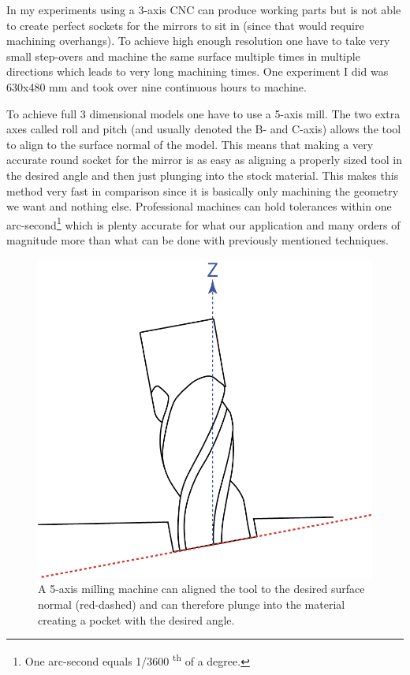 \documentclass{article}
\begin{document}
In my experiments using a 3-axis CNC can produce working parts but is
not able to create perfect sockets for the mirrors to sit in (since
that would require machining overhangs). To achieve high enough
resolution one have to take very small step-overs and machine the same
surface multiple times in multiple directions which leads to very long
machining times. One experiment I did was 630x480 mm and took over nine
continuous hours to machine.

To achieve full 3 dimensional models one have to use a 5-axis mill. The
two extra axes called roll and pitch (and usually denoted the B- and
C-axis) allows the tool to align to the surface normal of the model.
This means that making a very accurate round socket for the mirror is as
easy as aligning a properly sized tool in the desired angle and then
just plunging into the stock material. This makes this method very fast
in comparison since it is basically only machining the geometry we want
and nothing else. Professional machines can hold tolerances within one
arc-second\footnote{One arc-second equals 1/3600 \textsuperscript{th} of
  a degree.} which is plenty accurate for what our application and many
orders of magnitude more than what can be done with previously mentioned
techniques.

\begin{figure}[ht!]
\centering
\includegraphics{images/milling-tool-aligned.png}
\caption{A 5-axis milling machine can aligned the tool to the desired surface normal (red-dashed) and can therefore plunge into the material creating a pocket with the desired angle.}
\end{figure}
\end{document}
